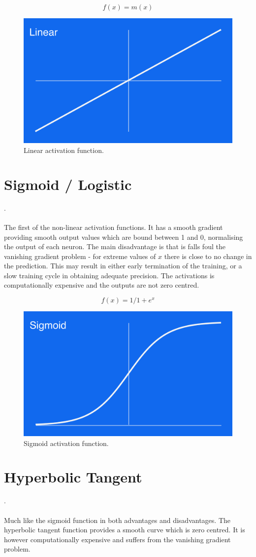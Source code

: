 \begin{equation}
    f(x) = m(x)
\end{equation}
\begin{figure}[H]
\centering
\includegraphics[width=.265\textwidth]{4fig/linear.png}
\caption{Linear activation function.}
\end{figure}

\section{Sigmoid / Logistic}.\\\\
The first of the non-linear activation functions. It has a smooth gradient providing smooth output values which are bound between 1 and 0, normalising the output of each neuron. The main disadvantage is that is falls foul the vanishing gradient problem - for extreme values of $x$ there is close to no change in the prediction. This may result in either early termination of the training, or a slow training cycle in obtaining adequate precision. The activations is computationally expensive and the outputs are not zero centred.

\begin{equation}
    f(x) = 1/1+e^x
\end{equation}
\begin{figure}[H]
\centering
\includegraphics[width=.265\textwidth]{4fig/sigmoid.png}
\caption{Sigmoid activation function.}
\end{figure}


\section{Hyperbolic Tangent}.\\\\
Much like the sigmoid function in both advantages and disadvantages. The hyperbolic tangent function provides a smooth curve which is zero centred. It is however computationally expensive and suffers from the vanishing gradient problem.

